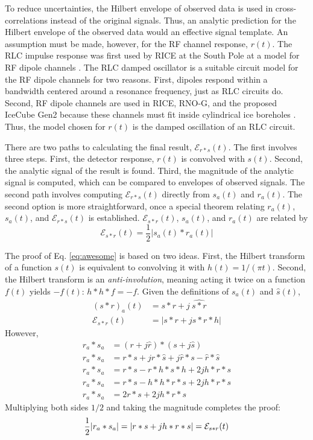 \documentclass[amsmath,amssymb,aps,prd,10pt,twocolumn,showkeys]{revtex4}
\begin{document}
To reduce uncertainties, the Hilbert envelope of observed data is used in cross-correlations instead of the original signals.  Thus, an analytic prediction for the Hilbert envelope of the observed data would an effective signal template.  An assumption must be made, however, for the RF channel response, $r(t)$.  The RLC impulse response was first used by RICE at the South Pole at a model for RF dipole channels \cite{10.1103/PhysRevD.85.062004}.  The RLC damped oscillator is a suitable circuit model for the RF dipole channels for two reasons.  First, dipoles respond within a bandwidth centered around a resonance frequency, just as RLC circuits do.  Second, RF dipole  channels are used in RICE, RNO-G, and the proposed IceCube Gen2 because these channels must fit inside cylindrical ice boreholes \cite{10.1088/1748-0221/16/03/p03025,10.48550/arxiv.2008.04323}.  Thus, the model chosen for $r(t)$ is the damped oscillation of an RLC circuit.

There are two paths to calculating the final result, $\mathcal{E}_{r*s}(t)$.  The first involves three steps.  First, the detector response, $r(t)$ is convolved with $s(t)$.  Second, the analytic signal of the result is found.  Third, the magnitude of the analytic signal is computed, which can be compared to envelopes of observed signals.  The second path involves computing $\mathcal{E}_{r*s}(t)$ directly from $s_a(t)$ and $r_a(t)$.  The second option is more straightforward, once a special theorem relating $r_a(t)$, $s_a(t)$, and $\mathcal{E}_{r*s}(t)$ is established.  $\mathcal{E}_{s * r}(t)$, $s_a(t)$, and $r_a(t)$ are related by
\begin{equation}
\mathcal{E}_{s * r}(t) = \frac{1}{2}| s_a (t) * r_a(t)| \label{eq:awesome}
\end{equation}

The proof of Eq. \ref{eq:awesome} is based on two ideas.  First, the Hilbert transform of a function $s(t)$ is equivalent to convolving it with $h(t) = 1/(\pi t)$.  Second, the Hilbert transform is an \textit{anti-involution}, meaning acting it twice on a function $f(t)$ yields $-f(t)$: $h * h * f = -f$.  Given the definitions of $s_a(t)$ and $\hat{s}(t)$,
\begin{align}
(s * r)_a (t) &= s * r + j ~ \widehat{s*r} \\
\mathcal{E}_{s * r}(t) &= | s * r + j s * r * h|
\end{align}
However,
\begin{align}
r_a * s_a &= (r + j \hat{r}) * (s + j \hat{s}) \\
r_a * s_a &= r * s + j r * \hat{s} + j \hat{r} * s - \hat{r} * \hat{s} \\
r_a * s_a &= r * s - r * h * s * h + 2 j h * r * s \\
r_a * s_a &= r * s - h * h * r * s + 2 j h * r * s \\
r_a * s_a &= 2 r * s + 2 j h * r * s
\end{align}
Multiplying both sides $1/2$ and taking the magnitude completes the proof:
\begin{equation}
\frac{1}{2} |r_a * s_a| = |r * s + j h * r * s| = \mathcal{E}_{s * r}(t) \\
\end{equation}
\end{document}
